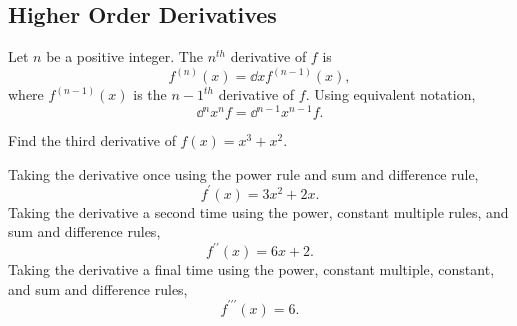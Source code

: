 \subsection{Higher Order Derivatives}
\begin{definition}
	Let $n$ be a positive integer. The $n^{th}$ derivative of $f$ is
	\begin{equation*}
		f^{(n)}(x) = \dd{}{x}{f^{(n-1)}}(x),
	\end{equation*}
	where $f^{(n-1)}(x)$ is the ${n-1}^{th}$ derivative of $f$.
	Using equivalent notation,
	\begin{equation*}
		\dd{{}^n}{x^n}f = \dd{{}^{n-1}}{x^{n-1}}f.
	\end{equation*}
\end{definition}

\begin{example}
	Find the third derivative of $f(x) = x^3 + x^2$.
\end{example}
Taking the derivative once using the power rule and sum and difference rule,
\begin{equation*}
	f^\prime(x) = 3x^2 + 2x.
\end{equation*}
\indent
Taking the derivative a second time using the power, constant multiple rules, and sum and difference rules,
\begin{equation*}
	f^{\prime\prime}(x) = 6x + 2.
\end{equation*}
\indent
Taking the derivative a final time using the power, constant multiple, constant, and sum and difference rules,
\begin{equation*}
	f^{\prime\prime\prime}(x) = 6.
\end{equation*}